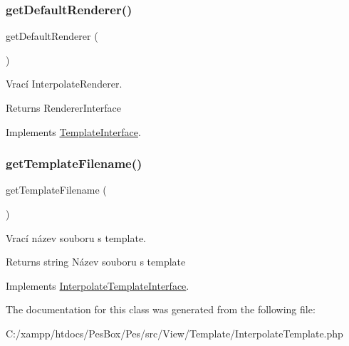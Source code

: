 \subsubsection{\texorpdfstring{get\+Default\+Renderer()}{getDefaultRenderer()}}
{\footnotesize\ttfamily get\+Default\+Renderer (\begin{DoxyParamCaption}{ }\end{DoxyParamCaption})}

Vrací Interpolate\+Renderer. \begin{DoxyReturn}{Returns}
Renderer\+Interface 
\end{DoxyReturn}


Implements \mbox{\hyperlink{interface_pes_1_1_view_1_1_template_1_1_template_interface}{Template\+Interface}}.

\mbox{\label{class_pes_1_1_view_1_1_template_1_1_interpolate_template_a487e0913fe1ce30f7cc6e1091abf6fdd}} 
\subsubsection{\texorpdfstring{get\+Template\+Filename()}{getTemplateFilename()}}
{\footnotesize\ttfamily get\+Template\+Filename (\begin{DoxyParamCaption}{ }\end{DoxyParamCaption})}

Vrací název souboru s template. \begin{DoxyReturn}{Returns}
string Název souboru s template 
\end{DoxyReturn}


Implements \mbox{\hyperlink{interface_pes_1_1_view_1_1_template_1_1_interpolate_template_interface}{Interpolate\+Template\+Interface}}.



The documentation for this class was generated from the following file\+:\begin{DoxyCompactItemize}
\item 
C\+:/xampp/htdocs/\+Pes\+Box/\+Pes/src/\+View/\+Template/Interpolate\+Template.\+php\end{DoxyCompactItemize}
